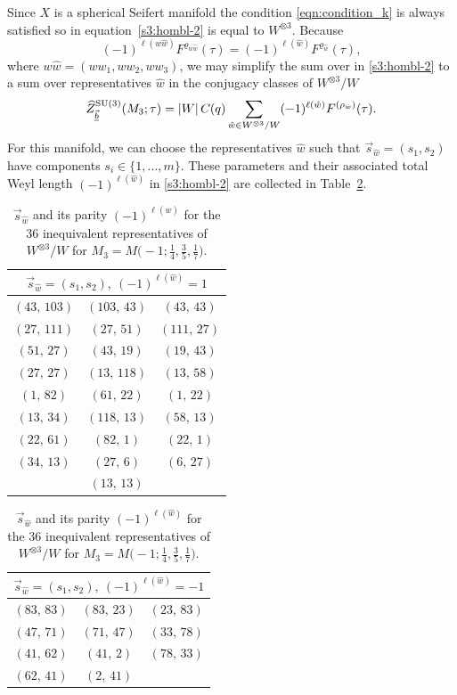 \documentclass[pdftex]{sigma}
\theoremstyle{definition}
\numberwithin{equation}{section}
\begin{document}
Since $X$ is a spherical Seifert manifold the condition \eqref{eqn:condition_k} is always satisfied so  in equation~\eqref{s3:hombl-2} is equal to $W^{\otimes 3}$. Because
\[
 (-1)^{\ell(w\hat w)}F^{\varrho_{w\hat w}}(\tau)=(-1)^{\ell(\hat w)}F^{\varrho_{\hat w}}(\tau),
\]
where $w\hat{w}=(ww_1,ww_2,ww_3)$, we may simplify the sum over  in \eqref{s3:hombl-2} to a sum over representatives $\hat{w}$ in the conjugacy classes of $W^{\otimes 3}/W$
\[%
\widehat{Z}^{{\rm SU}(3)}_{\vec{\underline{b}}}(M_3;\tau) =
\left|W\right|C_{}(q)
\sum_{\hat{w}\in W^{\otimes 3}/W }
(-1)^{\ell (\hat{w})}
F^{(\rho_{\hat w})} (\tau).
\]
For this manifold, we can choose the representatives $\hat{w}$ such that $\vec s_{\hat w} =(s_1,s_2)$ have components $s_{i} \in \{1,\dots , m\}$. These parameters and their associated total Weyl length $(-1)^{\ell({\hat{w}})}$ in \eqref{s3:hombl-2} are collected in Table~\ref{tab:s-brieskorn}.

\begin{table}\renewcommand{\arraystretch}{1.2}
 \centering
 \begin{minipage}{65mm}
 \begin{tabular}{ccc}
 \multicolumn{3}{c}{$\vec s_{\hat w} =( s_{1},s_{2} ),\ (-1)^{\ell(\hat{w})}=1$} \\\hline
 $(43,\,103)$ & $(103,\,43)$ & $(43,\,43)$ \\
 $(27,\,111)$ & $(27,\,51)$ & $(111,\,27)$ \\
 $(51,\,27)$ & $(43,\,19)$ & $(19,\,43)$ \\
 $(27,\,27)$ & $(13,\,118)$ & $(13,\,58)$ \\
 $(1,\,82)$ & $(61,\,22)$ & $(1,\,22)$ \\
 $(13,\,34)$ & $(118,\,13)$ & $(58,\,13)$ \\
 $(22,\,61)$ & $(82,\,1)$ & $(22,\,1)$ \\
 $(34,\,13)$ & $(27,\,6)$ & $(6,\,27)$ \\
 &$(13,\,13)$ &
 \end{tabular}
 \end{minipage}\qquad
 \begin{minipage}{55mm}
 \begin{tabular}{ccc}
 \multicolumn{3}{c}{$\vec s_{\hat w} =( s_{1},s_{2} ),\ (-1)^{\ell(\hat{w})}=-1$} \\\hline
 $(83,\,83)$ & $(83,\,23)$ & $(23,\,83)$ \\
 $(47,\,71)$ & $(71,\,47)$ & $(33,\,78)$ \\
 $(41,\,62)$ & $(41,\,2)$ & $(78,\,33)$ \\
 $(62,\,41)$ & $(2,\,41)$ \\
 \end{tabular}
 \vspace{2.75cm}
 \end{minipage}

\caption{$\vec s_{\hat w}$ and its parity $(-1)^{\ell(\hat{w})}$ for the 36 inequivalent representatives of $W^{\otimes 3}/W$ for $M_3=M\bigl(-1;\frac{1}{4},\frac{3}{5},\frac{1}{7}\bigr)$.}\label{tab:s-brieskorn}
\end{table}
\end{document}
